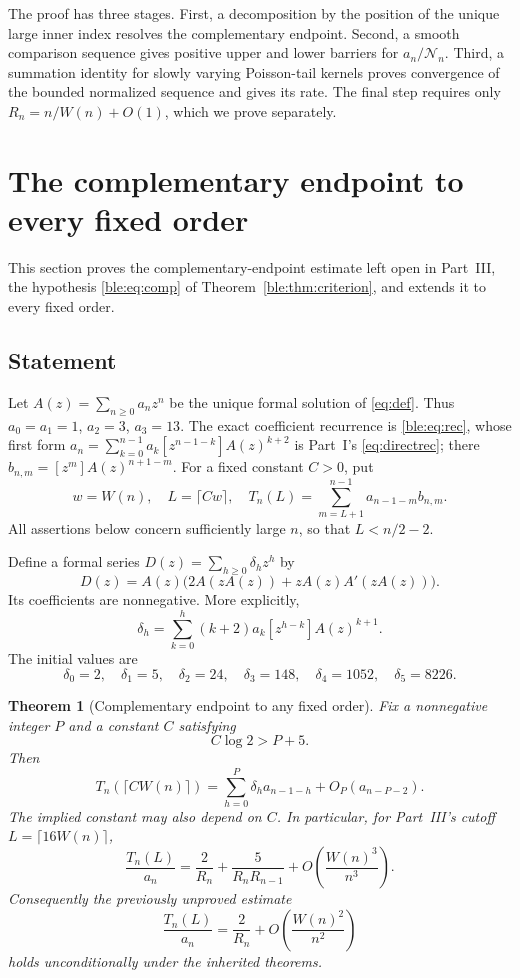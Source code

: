 \documentclass[11pt]{article}
\numberwithin{equation}{section}
\newtheorem{theorem}{Theorem}[section]
\theoremstyle{definition}
\theoremstyle{remark}
\begin{document}
The proof has three stages.  First, a decomposition by the position
of the unique large inner index resolves the complementary endpoint.
Second, a smooth comparison sequence gives positive upper and lower
barriers for \(a_n/\mathcal N_n\).  Third, a summation identity for
slowly varying Poisson-tail kernels proves convergence of the
bounded normalized sequence and gives its rate.  The final step
requires only \(R_n=n/W(n)+O(1)\), which we prove separately.


\section{The complementary endpoint to every fixed order}\label{bnc:sec:endpoint}

This section proves the complementary-endpoint estimate left open in
Part~III, the hypothesis \eqref{ble:eq:comp} of
Theorem~\ref{ble:thm:criterion}, and extends it to every fixed order.

\subsection{Statement}

Let \(A(z)=\sum_{n\ge0}a_nz^n\) be the unique formal solution of
\eqref{eq:def}.
Thus \(a_0=a_1=1\), \(a_2=3\), \(a_3=13\).
The exact coefficient recurrence is \eqref{ble:eq:rec}, whose first form
\(a_n=\sum_{k=0}^{n-1}a_k[z^{n-1-k}]A(z)^{k+2}\) is Part~I's
\eqref{eq:directrec}; there \(b_{n,m}=[z^m]A(z)^{n+1-m}\).
For a fixed constant \(C>0\), put
\[
 w=W(n),\quad L=\lceil Cw\rceil,\quad
 T_n(L)=\sum_{m=L+1}^{n-1}a_{n-1-m}b_{n,m}.
\]
All assertions below concern sufficiently large \(n\), so that
\(L<n/2-2\).

Define a formal series \(D(z)=\sum_{h\ge0}\delta_hz^h\) by
\[
 D(z)=A(z)\bigl(2A(zA(z))+zA(z)A'(zA(z))\bigr).
\]
Its coefficients are nonnegative.  More explicitly,
\[
 \delta_h=\sum_{k=0}^{h}(k+2)a_k[z^{h-k}]A(z)^{k+1}.
\]
The initial values are
\[
 \delta_0=2,\quad \delta_1=5,\quad \delta_2=24,\quad \delta_3=148,\quad
 \delta_4=1052,\quad \delta_5=8226.
\]

\begin{theorem}[Complementary endpoint to any fixed order]\label{bnc:thm:endpoint}
Fix a nonnegative integer \(P\) and a constant \(C\) satisfying
\[
 C\log 2>P+5.
\]
Then
\[
 \boxed{
 T_n(\lceil CW(n)\rceil)
   =\sum_{h=0}^{P}\delta_h a_{n-1-h}
      +O_P(a_{n-P-2}) .}
\]
The implied constant may also depend on \(C\).
In particular, for Part~III's cutoff \(L=\lceil16W(n)\rceil\),
\[
 \boxed{
 \frac{T_n(L)}{a_n}
   =\frac2{R_n}+\frac5{R_nR_{n-1}}
       +O\!\left(\frac{W(n)^3}{n^3}\right).}
\]
Consequently the previously unproved estimate
\[
 \frac{T_n(L)}{a_n}
       =\frac2{R_n}
           +O\!\left(\frac{W(n)^2}{n^2}\right)
\]
holds unconditionally under the inherited theorems.
\end{theorem}
\end{document}
